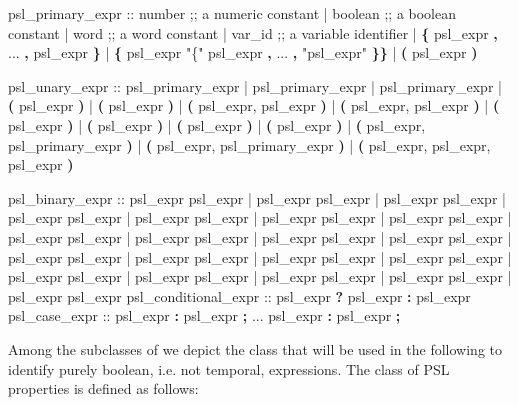 \begin{Grammar}
psl_primary_expr ::
   number                              ;; a numeric constant
 | boolean                             ;; a boolean constant
 | word                                ;; a word constant
 | var_id                              ;; a variable identifier
 | \textbf{\{} psl_expr \textbf{,} ... \textbf{,} psl_expr \textbf{\}}
 | \textbf{\{} psl_expr "\{" psl_expr \textbf{,} ... \textbf{,} "psl_expr" \textbf{\}}\textbf{\}}
 | \textbf{(} psl_expr \textbf{)}

psl_unary_expr ::
   \operator{+} psl_primary_expr
 | \operator{-} psl_primary_expr
 | \operator{!} psl_primary_expr
 |  \textbf{(} psl_expr \textbf{)}
 |  \textbf{(} psl_expr \textbf{)}
 |  \textbf{(} psl_expr, psl_expr \textbf{)}
 |  \textbf{(} psl_expr, psl_expr \textbf{)}
 |  \textbf{(} psl_expr \textbf{)}
 |  \textbf{(} psl_expr \textbf{)}
 |  \textbf{(} psl_expr \textbf{)}
 |  \textbf{(} psl_expr \textbf{)}
 |  \textbf{(} psl_expr, psl_primary_expr \textbf{)}
 |  \textbf{(} psl_expr, psl_primary_expr \textbf{)}
 |  \textbf{(} psl_expr, psl_expr, psl_expr \textbf{)}

psl_binary_expr ::
   psl_expr \operator{+} psl_expr
 | psl_expr  psl_expr
 | psl_expr  psl_expr
 | psl_expr \operator{-} psl_expr
 | psl_expr \operator{*}psl_expr
 | psl_expr \operator{/} psl_expr
 | psl_expr \operator{\%} psl_expr
 | psl_expr \operator{==} psl_expr
 | psl_expr \operator{!=} psl_expr
 | psl_expr \operator{<} psl_expr
 | psl_expr \operator{<=} psl_expr
 | psl_expr \operator{>} psl_expr
 | psl_expr \operator{>=} psl_expr
 | psl_expr \operator{&} psl_expr
 | psl_expr \operator{|} psl_expr
 | psl_expr  psl_expr
 | psl_expr  psl_expr
 | psl_expr \operator{<<} psl_expr
 | psl_expr \operator{>>} psl_expr
 | psl_expr \operator{::} psl_expr
psl_conditional_expr ::
 psl_expr \textbf{?} psl_expr \textbf{:} psl_expr
psl_case_expr ::
     psl_expr \textbf{:} psl_expr \textbf{;}
     ...
     psl_expr \textbf{:} psl_expr \textbf{;}
\end{Grammar}
%
Among the subclasses of  we depict the class
 that will be used in the following to identify purely
boolean, i.e. not temporal, expressions. The class of PSL properties
 is defined as follows:
